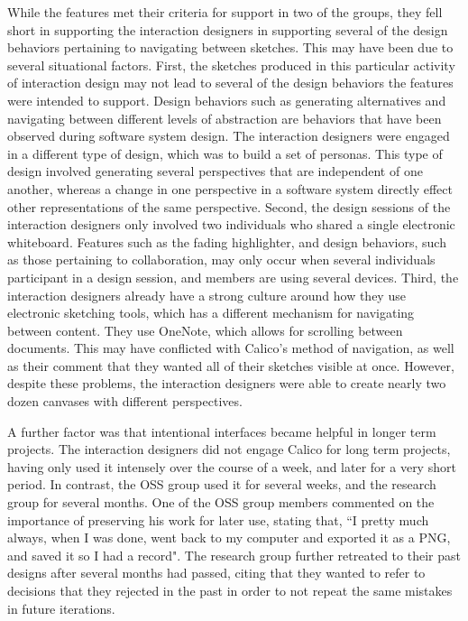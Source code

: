 \documentclass[12pt,fleqn]{ucithesis}
\begin{document}
While the features met their criteria for support in two of the groups, they fell short in supporting the interaction designers in supporting several of the design behaviors pertaining to navigating between sketches. This may have been due to several situational factors. First, the sketches produced in this particular activity of interaction design may not lead to several of the design behaviors the features were intended to support. Design behaviors such as generating alternatives and navigating between different levels of abstraction are behaviors that have been observed during software system design. The interaction designers were engaged in a different type of design, which was to build a set of personas. This type of design involved generating several perspectives that are independent of one another, whereas a change in one perspective in a software system directly effect other representations of the same perspective. Second, the design sessions of the interaction designers only involved two individuals who shared a single electronic whiteboard. Features such as the fading highlighter, and design behaviors, such as those pertaining to collaboration, may only occur when several individuals participant in a design session, and members are using several devices. Third, the interaction designers already have a strong culture around how they use electronic sketching tools, which has a different mechanism for navigating between content. They use OneNote, which allows for scrolling between documents. This may have conflicted with Calico's method of navigation, as well as their comment that they wanted all of their sketches visible at once. However, despite these problems, the interaction designers were able to create nearly two dozen canvases with different perspectives.



A further factor was that intentional interfaces became helpful in longer term projects. The interaction designers did not engage Calico for long term projects, having only used it intensely over the course of a week, and later for a very short period. In contrast, the OSS group used it for several weeks, and the research group for several months. One of the OSS group members commented on the importance of preserving his work for later use, stating that, ``I pretty much always, when I was done, went back to my computer and exported it as a PNG, and saved it so I had a record". The research group further retreated to their past designs after several months had passed, citing that they wanted to refer to decisions that they rejected in the past in order to not repeat the same mistakes in future iterations. 
\end{document}
